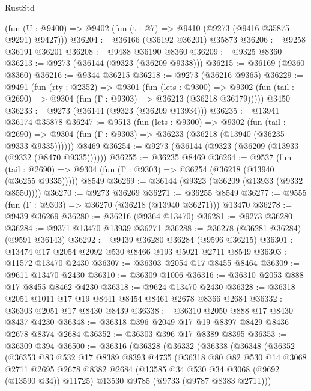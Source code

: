 \begin{lexlean}{RustStd}
\begin{coremodule}
{\begin{coremodule}
{{{{{{{{{{{{{{{{{{{{{{{{{{{{{{{{{{{{{{{{{{{{{{{{{{{{{{{    (fun (U : @9400) => @9402 (fun (t : @7) => @9410 (@9273 (@9416 @35875 @9291) @9427)))
@36204 := @36166 (@36192 @36201) @35873
@36206 := @9258 @36191 @36201
@36208 := @9488 @36190 @8360
@36209 := @9325 @8360
@36213 := @9273 (@36144 (@9323 (@36209 @9338)))
@36215 := @36169 (@9360 @8360)
@36216 := @9344 @36215
@36218 := @9273 (@36216 @9365)
@36229 := @9491
    (fun (rty : @2352) =>
    @9301
      (fun (lets : @9300) =>
      @9302 (fun (tail : @2690) => @9304 (fun (Γ : @9303) => @36213 (@36218 @36179)))))
    @3450
@36233 := @9273 (@36144 (@9323 (@36209 @13934)))
@36235 := @13941 @36174 @35878
@36247 := @9513
    (fun (lets : @9300) =>
    @9302
      (fun (tail : @2690) =>
      @9304 (fun (Γ : @9303) => @36233 (@36218 (@13940 (@36235 @9333 @9335))))))
    @8469
@36254 := @9273 (@36144 (@9323 (@36209 (@13933 (@9332 (@8470 @9335))))))
@36255 := @36235 @8469
@36264 := @9537
    (fun (tail : @2690) => @9304 (fun (Γ : @9303) => @36254 (@36218 (@13940 (@36255 @9335)))))
    @8549
@36269 := @36144 (@9323 (@36209 (@13933 (@9332 @8550))))
@36270 := @9273 @36269
@36271 := @36255 @8549
@36277 := @9555 (fun (Γ : @9303) => @36270 (@36218 (@13940 @36271))) @13470
@36278 := @9439 @36269
@36280 := @36216 (@9364 @13470)
@36281 := @9273 @36280
@36284 := @9371 @13470 @13939 @36271
@36288 := @36278 (@36281 @36284) (@9591 @36143)
@36292 := @9439 @36280 @36284 (@9596 @36215)
@36301 := @13474 @17 @2054 @2092 @530 @8466 @193 @5021 @2711 @8549
@36303 := @11572 @13470 @2430
@36307 := @36303 @2054 @17 @8455 @8464
@36309 := @9611 @13470 @2430
@36310 := @36309 @1006
@36316 := @36310 @2053 @888 @17 @8455 @8462 @4230
@36318 := @9624 @13470 @2430
@36328 := @36318 @2051 @1011 @17 @19 @8441 @8454 @8461 @2678 @8366 @2684
@36332 := @36303 @2051 @17 @8430 @8439
@36338 := @36310 @2050 @888 @17 @8430 @8437 @4230
@36348 := @36318 @396 @2049 @17 @19 @8397 @8429 @8436 @2678 @8374 @2684
@36352 := @36303 @396 @17 @8389 @8395
@36353 := @36309 @394
@36500 := @36316
    (@36328
      (@36332
        (@36338
          (@36348
            (@36352
              (@36353
                @83
                @532
                @17
                @8389
                @8393
                @4735
                (@36318
                  @80
                  @82
                  @530
                  @14
                  @3068
                  @2711
                  @2695
                  @2678
                  @8382
                  @2684
                  (@13585 @34 @530 @34 @3068 (@9692 (@13590 @34)) @11725)
                  @13530
                  @9785
                  (@9733 (@9787 @8383 @2711)))
}}}}}}}}}}}}}}}}}}}}}}}}}}}}}}}}}}}}}}}}}}}}}}}}}}}}}}}
\end{coremodule}}
\end{coremodule}
\end{lexlean}
